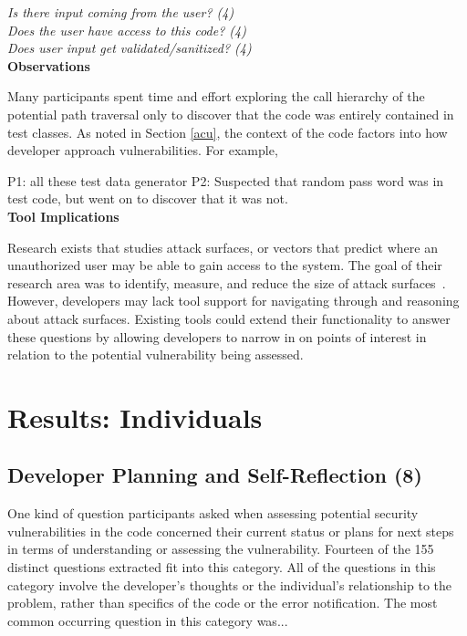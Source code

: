 \documentclass[conference]{IEEEtran}
\begin{document}
\noindent\emph{Is there input coming from the user? (4)} \\
\emph{Does the user have access to this code? (4)} \\
\emph{Does user input get validated/sanitized? (4)} \\


\noindent\textbf{Observations}

Many participants spent time and effort exploring the call hierarchy of the potential path traversal only to discover that the code was entirely contained in test classes. As noted in Section \ref{acu}, the context of the code factors into how developer approach vulnerabilities. For example, 

P1: all these test data generator
P2: Suspected that random pass word was in test code, but went on to discover that it was not.
\\

\noindent\textbf{Tool Implications}

Research exists that studies attack surfaces, or vectors that predict where an unauthorized user may be able to gain access to the system.
The goal of their research area was to identify, measure, and reduce the size of attack surfaces~\cite{manadhata2011attack, bartel2012automatically}. 
However, developers may lack tool support for navigating through and reasoning about attack surfaces.
Existing tools could extend their functionality to answer these questions by allowing developers to narrow in on points of interest in relation to the potential vulnerability being assessed.



\section{Results: Individuals}
\label{sec:results-i}



\noindent\subsection{\textbf{Developer Planning and Self-Reflection (8)}} \label{dpr}

One kind of question participants asked when assessing potential security vulnerabilities in the code concerned their current status or plans for next steps in terms of understanding or assessing the vulnerability. 
Fourteen of the 155 distinct questions extracted fit into this category. 
All of the questions in this category involve the developer's thoughts or the individual's relationship to the problem, rather than specifics of the code or the error notification.  
The most common occurring question in this category was...
\\
\end{document}
